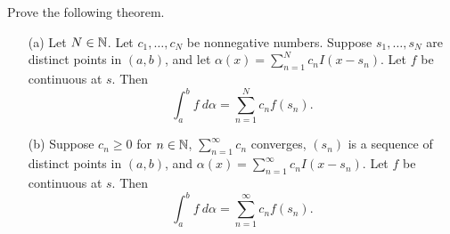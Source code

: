\documentclass[a4paper]{article}
\begin{document}
\begin{problem}
    Prove the following theorem.
\end{problem}
\begin{theorem}
    \begin{enumerate}
        \item[(a)] Let \( N \in \mathbb{N} \). Let \( {c}_{1}, \dots, {c}_{N} \) be nonnegative numbers. Suppose \( {s}_{1}, \dots, {s}_{N} \) are distinct points in \( (a,b) \), and let \( \alpha(x) = \sum_{ n=1  }^{ N } {c}_{n} I(x - {s}_{n}) \). Let \( f  \) be continuous at \( s  \). Then
            \[  \int_{ a }^{ b } f \ d \alpha = \sum_{ n=1  }^{ N  } {c}_{n} f({s}_{n}).  \] \item[(b)] Suppose \( {c}_{n} \geq 0  \) for \( n \in \mathbb{N} \), \( \sum_{ n=1  }^{ \infty  } {c}_{n} \) converges, \( ({s}_{n}) \) is a sequence of distinct points in \( (a,b) \), and \( \alpha(x) = \sum_{ n=1  }^{ \infty  } {c}_{n} I (x - {s}_{n}) \). Let \( f \) be continuous at \( s  \). Then
            \[  \int_{ a }^{ b } f  \ d \alpha = \sum_{ n=1  }^{ \infty  } {c}_{n} f({s}_{n}). \]
    \end{enumerate}
\end{theorem}
\end{document}
